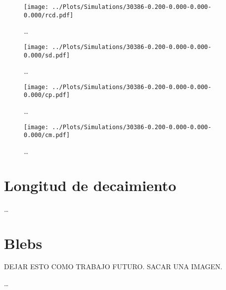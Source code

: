 \begin{figure}
    \centering
    \texttt{[image: ../Plots/Simulations/30386-0.200-0.000-0.000-0.000/rcd.pdf]}
    \caption{\dots}
    \label{fig:rcd_i}
\end{figure}

\begin{figure}
    \centering
    \texttt{[image: ../Plots/Simulations/30386-0.200-0.000-0.000-0.000/sd.pdf]}
    \caption{\dots}
    \label{fig:sd_i}
\end{figure}

\begin{figure}
    \centering
    \texttt{[image: ../Plots/Simulations/30386-0.200-0.000-0.000-0.000/cp.pdf]}
    \caption{\dots}
    \label{fig:cp_i}
\end{figure}

\begin{figure}
    \centering
    \texttt{[image: ../Plots/Simulations/30386-0.200-0.000-0.000-0.000/cm.pdf]}
    \caption{\dots}
    \label{fig:cm_i}
\end{figure}

\section{Longitud de decaimiento}

\dots

\section{Blebs}

DEJAR ESTO COMO TRABAJO FUTURO. SACAR UNA IMAGEN.

\dots
